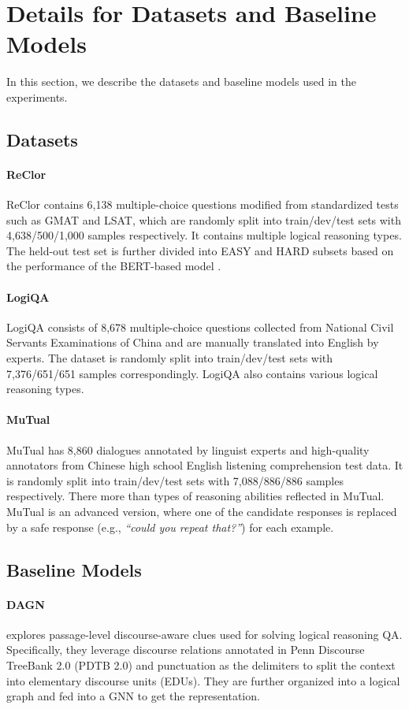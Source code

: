\documentclass[11pt]{article}
\begin{document}
\section{Details for Datasets and Baseline Models}\label{detail_datasets}

In this section, we describe the datasets and baseline models used in the experiments.

\subsection{Datasets}
\paragraph{ReClor} ReClor contains 6,138 multiple-choice questions modified from standardized tests such as GMAT and LSAT, which are randomly split into train/dev/test sets with 4,638/500/1,000 samples respectively. It contains multiple logical reasoning types. The held-out test set is further divided into EASY and HARD subsets based on the performance of the BERT-based model \cite{devlin-etal-2019-bert}.
\paragraph{LogiQA} LogiQA consists of 8,678 multiple-choice questions collected from National Civil Servants Examinations of China and are manually translated into English by experts. The dataset is randomly split into train/dev/test sets with 7,376/651/651 samples correspondingly. LogiQA also contains various logical reasoning types.
\paragraph{MuTual}  MuTual has 8,860 dialogues annotated by linguist experts and high-quality annotators from Chinese high school English listening comprehension test data. It is randomly split into train/dev/test sets with 7,088/886/886 samples respectively. There more than  types of reasoning abilities reflected in MuTual. MuTual is an advanced version, where one of the candidate responses is replaced by a safe response (e.g., \textit{``could you repeat that?''}) for each example.
\subsection{Baseline Models}
\paragraph{DAGN} explores passage-level discourse-aware clues used for solving logical reasoning QA. Specifically, they leverage discourse relations annotated in Penn Discourse TreeBank 2.0 (PDTB 2.0) \citep{prasad2008penn} and punctuation as the delimiters to split the context into elementary discourse units (EDUs). They are further organized into a logical graph and fed into a GNN to get the representation.
\end{document}
